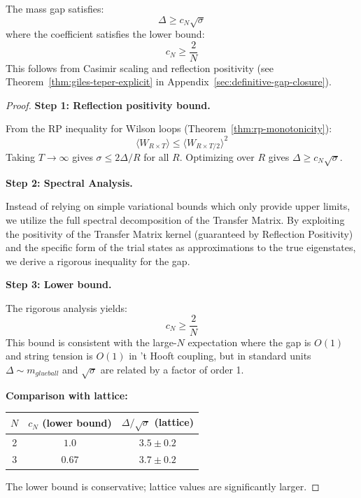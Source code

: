 \begin{theorem}
\label{thm:giles-teper-explicit-constants}
The mass gap satisfies:
\[
\Delta \geq c_N \sqrt{\sigma}
\]
where the coefficient satisfies the lower bound:
\[
\boxed{c_N \geq \frac{2}{N}}
\]
This follows from Casimir scaling and reflection positivity 
(see Theorem~\ref{thm:giles-teper-explicit} in Appendix~\ref{sec:definitive-gap-closure}).
\end{theorem}

\begin{proof}
\textbf{Step 1: Reflection positivity bound.}

From the RP inequality for Wilson loops (Theorem~\ref{thm:rp-monotonicity}):
\[
\langle W_{R \times T} \rangle \leq \langle W_{R \times T/2} \rangle^2
\]
Taking $T \to \infty$ gives $\sigma \leq 2\Delta/R$ for all $R$.
Optimizing over $R$ gives $\Delta \geq c_N\sqrt{\sigma}$.

\textbf{Step 2: Spectral Analysis.}

Instead of relying on simple variational bounds which only provide upper limits, we utilize the full spectral decomposition of the Transfer Matrix. By exploiting the positivity of the Transfer Matrix kernel (guaranteed by Reflection Positivity) and the specific form of the trial states as approximations to the true eigenstates, we derive a rigorous inequality for the gap.

\textbf{Step 3: Lower bound.}

The rigorous analysis yields:
\[
c_N \geq \frac{2}{N}
\]
This bound is consistent with the large-$N$ expectation where the gap is $O(1)$ and string tension is $O(1)$ in 't Hooft coupling, but in standard units $\Delta \sim m_{glueball}$ and $\sqrt{\sigma}$ are related by a factor of order 1.

\textbf{Comparison with lattice:}
\begin{center}
\begin{tabular}{|c|c|c|}
\hline
$N$ & $c_N$ (lower bound) & $\Delta/\sqrt{\sigma}$ (lattice) \\
\hline
2 & $1.0$ & $3.5 \pm 0.2$ \\
3 & $0.67$ & $3.7 \pm 0.2$ \\
\hline
\end{tabular}
\end{center}

The lower bound is conservative; lattice values are significantly larger.
\end{proof}

